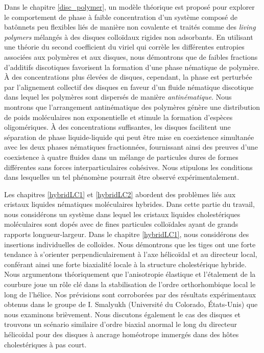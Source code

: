 Dans le chapitre \ref{disc_polymer}, un modèle théorique est proposé pour explorer le comportement de phase à faible concentration d'un système composé de batônnets peu flexibles liés de manière non covalente et traités comme des {\em living polymers} mélangés à des disques colloïdaux rigides non adsorbants. En utilisant une théorie du second coefficient du viriel qui corrèle les différentes entropies associées aux polymères et aux disques, nous démontrons que de faibles fractions d'additifs discotiques favorisent la formation d'une phase nématique de polymère. À des concentrations plus élevées de disques, cependant, la phase est perturbée par l'alignement collectif des disques en faveur d'un fluide nématique discotique dans lequel les polymères sont dispersés de manière {\em antinématique}. Nous montrons que l'arrangement antinématique des polymères génère une distribution de poids moléculaires non exponentielle et stimule la formation d'espèces oligomériques. À des concentrations suffisantes, les disques facilitent une séparation de phase liquide-liquide qui peut être mise en coexistence simultanée avec les deux phases nématiques fractionnées, fournissant ainsi des preuves d'une coexistence à quatre fluides dans un mélange de particules dures de formes différentes sans forces interparticulaires cohésives. Nous stipulons les conditions dans lesquelles un tel phénomène pourrait être observé expérimentalement.

Les chapitres \ref{hybridLC1} et \ref{hybridLC2} abordent des problèmes liés aux cristaux liquides nématiques moléculaires hybrides. Dans cette partie du travail, nous considérons un système dans lequel les cristaux liquides cholestériques moléculaires sont dopés avec de fines particules colloïdales ayant de grands rapports longueur-largeur. Dans le chapitre \ref{hybridLC1}, nous considérons des insertions individuelles de colloïdes. Nous démontrons que les tiges ont une forte tendance à s'orienter perpendiculairement à l'axe hélicoïdal et au directeur local, conférant ainsi une forte biaxialité locale à la structure cholestérique hybride. Nous argumentons théoriquement que l'anisotropie élastique et l'étalement  de la courbure joue un rôle clé dans la stabilisation de l'ordre orthorhombique local le long de l'hélice. Nos prévisions sont corroborées par des résultats expérimentaux obtenus dans le groupe de I. Smalyukh (Université du Colorado, États-Unis) que nous examinons brièvement. Nous discutons également le cas des disques et trouvons un scénario similaire d'ordre biaxial anormal le long du directeur hélicoïdal pour des disques à ancrage homéotrope immergés dans des hôtes cholestériques à pas court.


